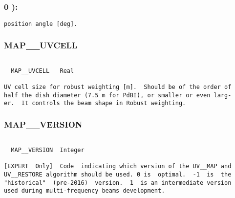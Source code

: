 \subsubsection{0 ):}
\begin{verbatim}
position angle [deg].

\end{verbatim}
\subsubsection{MAP\_\_UVCELL}
\begin{verbatim}

  MAP__UVCELL   Real

UV cell size for robust weighting [m].  Should be of the order of
half the dish diameter (7.5 m for PdBI), or smaller or even larg-
er.  It controls the beam shape in Robust weighting.

\end{verbatim}
\subsubsection{MAP\_\_VERSION}
\begin{verbatim}

  MAP__VERSION  Integer

[EXPERT  Only]  Code  indicating which version of the UV__MAP and
UV__RESTORE algorithm should be used. 0 is  optimal.  -1  is  the
"historical"  (pre-2016)  version.  1  is an intermediate version
used during multi-frequency beams development.



\end{verbatim}
